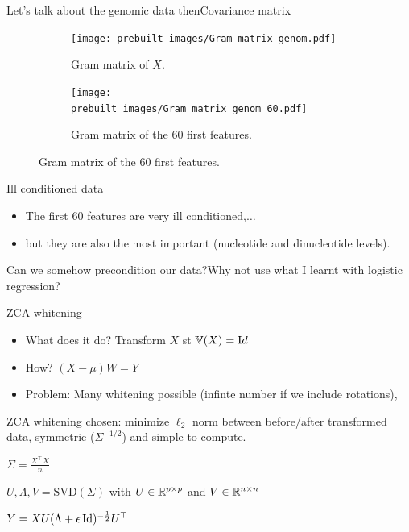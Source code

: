 \documentclass[10pt,aspectratio=43]{beamer}
\begin{document}
\begin{frame}{Let's talk about the genomic data then}{Covariance matrix}
    \begin{figure}[ht!]
        \begin{subfigure}{.4\paperwidth}
            \centering
            \texttt{[image: prebuilt\_images/Gram\_matrix\_genom.pdf]}
            \caption{Gram matrix of $X$.}
        \end{subfigure}
        \begin{subfigure}{.4\paperwidth}
            \centering
            \texttt{[image: prebuilt\_images/Gram\_matrix\_genom\_60.pdf]}
            \caption{Gram matrix of the $60$ first features.}
        \end{subfigure}
    \end{figure}
    \begin{alertblock}{Ill conditioned data}
        \begin{itemize}
            \item The first $60$ features are very ill conditioned,$\dots$
            \item but they are also the most important (nucleotide and dinucleotide levels).
        \end{itemize}
    \end{alertblock}
\end{frame}


\begin{frame}{Can we somehow precondition our data?}{Why not use what I learnt with logistic regression?}
    \begin{block}{ZCA whitening}
        \begin{itemize}
            \item What does it do? Transform $X$ st $\mathbb{V}(X)=\mathrm{I}d$
            \item How? $(X-\mu)W=Y$
            \item Problem: Many whitening possible (infinte number if we include rotations),
        \end{itemize}
    \end{block}
        \pause
        ZCA whitening chosen: minimize $\ell_2$ norm between before/after transformed data, symmetric ($\Sigma^{-1/2}$) and simple to compute.
        \medskip
        \begin{algorithm}[H]
            \caption{ZCA whitening of a centered matrix.}

            $\Sigma = \frac{X^\top X}{n}$

            $U, \Lambda, V = \mathrm{SVD}(\Sigma)$ with $U\in\mathbb{R}^{p\times p}$ and $V\in\mathbb{R}^{n\times n}$


            $Y = X U (\Lambda + \epsilon\operatorname{Id})^{-\frac{1}{2}} U^\top$

        \end{algorithm}
\end{frame}
\end{document}
